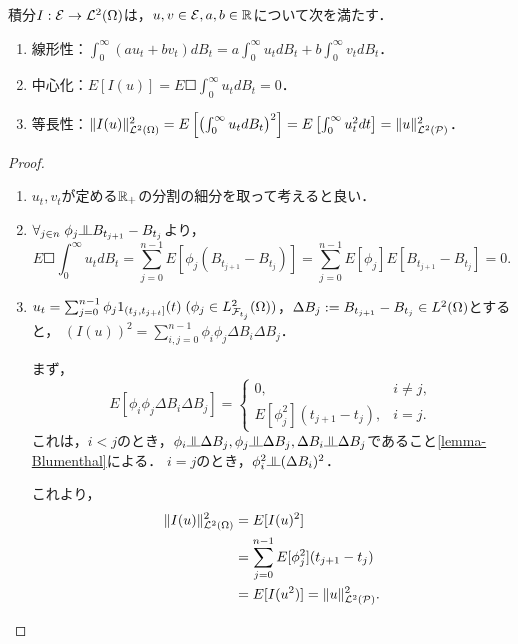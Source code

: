 \documentclass[uplatex,dvipdfmx]{jsreport}
\begin{document}
\begin{lemma}[単関数上の積分の性質]\label{lemma-property-of-SI-on-E}
    積分$I:\mathcal{E}\to\mathcal{L}^2(\Omega)$は，$u,v\in\mathcal{E},a,b\in\mathbb{R}$について次を満たす．
    \begin{enumerate}
        \item 線形性：$\int^\infty_0(au_t+bv_t)dB_t=a\int^\infty_0u_tdB_t+b\int^\infty_0v_tdB_t$．
        \item 中心化：$E[I(u)]=E\Square{\int^\infty_0u_tdB_t}=0$．
        \item 等長性：$\|I(u)\|^2_{\mathcal{L}^2(\Omega)}=E\left[\left(\int^\infty_0u_tdB_t\right)^2\right]=E\left[\int^\infty_0u^2_tdt\right]=\|u\|^2_{\mathcal{L}^2(\mathcal{P})}$．
    \end{enumerate}
\end{lemma}
\begin{proof}\mbox{}
    \begin{enumerate}
        \item $u_t,v_t$が定める$\mathbb{R}_+$の分割の細分を取って考えると良い．
        \item $\forall_{j\in n}\;\phi_j\indep B_{t_{j+1}}-B_{t_j}$より，
        \[E\Square{\int^\infty_0u_tdB_t}=\sum^{n-1}_{j=0}E[\phi_j(B_{t_{j+1}}-B_{t_j})]=\sum^{n-1}_{j=0}E[\phi_j]E[B_{t_{j+1}}-B_{t_j}]=0.\]
        \item $u_t=\sum^{n-1}_{j=0}\phi_j1_{(t_j,t_{j+t}]}(t)\;(\phi_j\in L^2_{\mathcal{F}_{t_j}}(\Omega))$，$\Delta B_j:=B_{t_{j+1}}-B_{t_j}\in L^2(\Omega)$とすると，
        $(I(u))^2=\sum^{n-1}_{i,j=0}\phi_i\phi_j\Delta B_i\Delta B_j$．

        まず，
        \[E[\phi_i\phi_j\Delta B_i\Delta B_j]=\begin{cases}
            0,&i\ne j,\\
            E[\phi_j^2](t_{j+1}-t_j),&i=j.
        \end{cases}\]
        これは，$i<j$のとき，$\phi_i\indep\Delta B_j,\phi_j\indep\Delta B_j,\Delta B_i\indep\Delta B_j$であること\ref{lemma-Blumenthal}による．
        $i=j$のとき，$\phi^2_i\indep(\Delta B_i)^2$．

        これより，
        \begin{align*}
            \|I(u)\|^2_{\mathcal{L}^2(\Omega)}&=E[I(u)^2]\\
            &=\sum^{n-1}_{j=0}E[\phi_j^2](t_{j+1}-t_j)\\
            &=E[I(u^2)]=\|u\|^2_{\mathcal{L}^2(\mathcal{P})}.
        \end{align*}
    \end{enumerate}
\end{proof}
\end{document}
